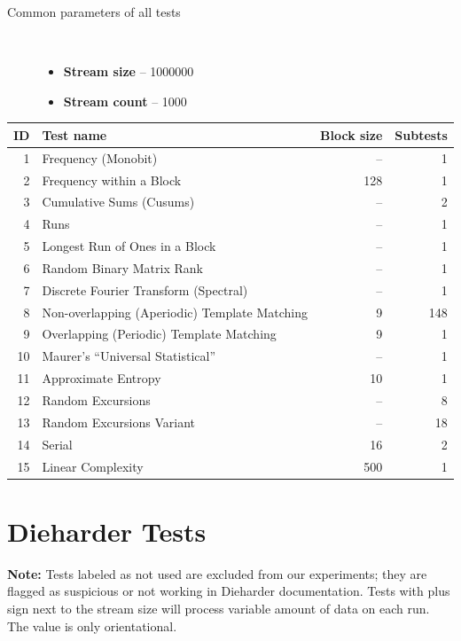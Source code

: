 \documentclass[
  digital,  	%
  color,		%
  oneside,   	%
  12pt,
  nocover,
  notable,
  nolof,
  nolot,
]{fithesis3}
\newenvironment{titlemize}[1]
{
	\begin{description}
	\item[#1]\
	\begin{itemize}
}
{
	\end{itemize}
 	\end{description}
}
\theoremstyle{definition}
\theoremstyle{remark}
\begin{document}
\begin{titlemize}{Common parameters of all tests}
\item \textbf{Stream size} -- 1000000
\item \textbf{Stream count} -- 1000
\end{titlemize}

\begin{nomar}
\centering
\begin{tabular}{ r | l | r | r }
\textbf{ID} & \textbf{Test name} & \textbf{Block size} & \textbf{Subtests} \\ \hline \hline
1  & Frequency (Monobit)                           & --  & 1 \\
2  & Frequency within a Block                      & 128 & 1 \\
3  & Cumulative Sums (Cusums)	                   & --  & 2 \\
4  & Runs                                          & --  & 1 \\
5  & Longest Run of Ones in a Block                & --  & 1 \\
6  & Random Binary Matrix Rank                     & --  & 1 \\
7  & Discrete Fourier Transform (Spectral)         & --  & 1 \\
8  & Non-overlapping (Aperiodic) Template Matching & 9   & 148 \\
9  & Overlapping (Periodic) Template Matching      & 9   & 1 \\
10 & Maurer's “Universal Statistical” 	           & --  & 1 \\
11 & Approximate Entropy 	                       & 10  & 1 \\
12 & Random Excursions 	                           & --  & 8 \\
13 & Random Excursions Variant	                   & --  & 18 \\
14 & Serial                                        & 16  & 2 \\
15 & Linear Complexity	                           & 500 & 1 \\
\end{tabular}
\end{nomar}

\chapter{Dieharder Tests}
\label{app:dieharder_tests}
\textbf{Note:} Tests labeled as not used are excluded from our experiments; they are flagged as suspicious or not working in Dieharder documentation. Tests with plus sign next to the stream size will process variable amount of data on each run. The value is only orientational.
\end{document}
